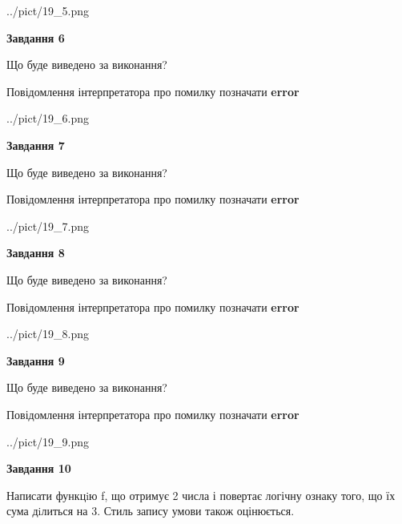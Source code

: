 \documentclass[12pt, ukrainian]{article}
\begin{document}
{\begin {large}
\begin{center}
	{../pict/19_5.png}
\end{center}
\newpage

{\begin {center}\textbf{Завдання 6}\end {center}}\par
Що буде виведено за виконання? \par
Повідомлення інтерпретатора про помилку позначати \textbf{error}

\begin{center}
	{../pict/19_6.png}
\end{center}
\newpage

{\begin {center}\textbf{Завдання 7}\end {center}}\par
Що буде виведено за виконання? \par
Повідомлення інтерпретатора про помилку позначати \textbf{error}

\begin{center}
	{../pict/19_7.png}
\end{center}
\newpage

{\begin {center}\textbf{Завдання 8}\end {center}}\par
Що буде виведено за виконання? \par
Повідомлення інтерпретатора про помилку позначати \textbf{error}

\begin{center}
	{../pict/19_8.png}
\end{center}
\newpage

{\begin {center}\textbf{Завдання 9}\end {center}}\par
Що буде виведено за виконання? \par
Повідомлення інтерпретатора про помилку позначати \textbf{error}

\begin{center}
	{../pict/19_9.png}
\end{center}
\newpage

{\begin {center}\textbf{Завдання 10}\end {center}}\par

Написати функцiю f, що отримує 2 числа і повертає логічну ознаку того, що їх сума дiлиться на 3. Стиль запису умови також оцінюється.\par
\newpage

\end {large}}
\end{document}
